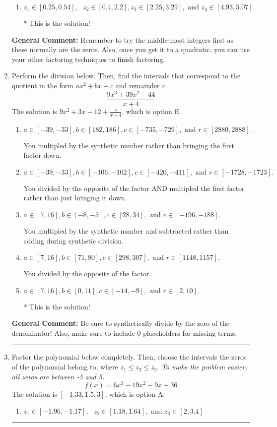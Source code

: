 \documentclass{extbook}[14pt]
\newcommand{\litem}[1]{\item #1

\rule{\textwidth}{0.4pt}}
\begin{document}
\begin{enumerate}
{\begin{enumerate}[label=\Alph*.]
 Distractor 4: Corresponds to moving factors from one rational to another.
\item \( z_1 \in [0.25, 0.54], \text{   }  z_2 \in [0.4, 2.2], z_3 \in [2.25, 3.29], \text{   and   } z_4 \in [4.93, 5.07] \)

* This is the solution!
\end{enumerate}

\textbf{General Comment:} Remember to try the middle-most integers first as these normally are the zeros. Also, once you get it to a quadratic, you can use your other factoring techniques to finish factoring.
}
\litem{
Perform the division below. Then, find the intervals that correspond to the quotient in the form $ax^2+bx+c$ and remainder $r$.
\[ \frac{9x^{3} +39 x^{2} -44}{x + 4} \]The solution is \( 9x^{2} +3 x -12 + \frac{4}{x + 4} \), which is option E.\begin{enumerate}[label=\Alph*.]
\item \( a \in [-39, -33], b \in [182, 186], c \in [-735, -729], \text{ and } r \in [2880, 2888]. \)

 You multipled by the synthetic number rather than bringing the first factor down.
\item \( a \in [-39, -33], b \in [-106, -102], c \in [-420, -411], \text{ and } r \in [-1728, -1723]. \)

 You divided by the opposite of the factor AND multipled the first factor rather than just bringing it down.
\item \( a \in [7, 16], b \in [-8, -5], c \in [28, 34], \text{ and } r \in [-196, -188]. \)

 You multipled by the synthetic number and subtracted rather than adding during synthetic division.
\item \( a \in [7, 16], b \in [71, 80], c \in [298, 307], \text{ and } r \in [1148, 1157]. \)

 You divided by the opposite of the factor.
\item \( a \in [7, 16], b \in [0, 11], c \in [-14, -9], \text{ and } r \in [2, 10]. \)

* This is the solution!
\end{enumerate}

\textbf{General Comment:} Be sure to synthetically divide by the zero of the denominator! Also, make sure to include 0 placeholders for missing terms.
}
\litem{
Factor the polynomial below completely. Then, choose the intervals the zeros of the polynomial belong to, where $z_1 \leq z_2 \leq z_3$. \textit{To make the problem easier, all zeros are between -5 and 5.}
\[ f(x) = 6x^{3} -19 x^{2} -9 x + 36 \]The solution is \( [-1.33, 1.5, 3] \), which is option A.\begin{enumerate}[label=\Alph*.]
\item \( z_1 \in [-1.96, -1.17], \text{   }  z_2 \in [1.18, 1.64], \text{   and   } z_3 \in [2, 3.4] \)


\end{enumerate}}
\end{enumerate}
\end{document}
